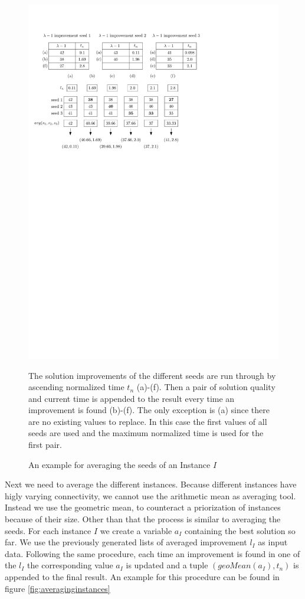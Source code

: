 \documentclass[a4paper,12pt,titlepage, BCOR7mm,headsepline]{scrbook}
\numberwithin{equation}{section}
\begin{document}
\begin{figure}[H] 
    
  \begin{center}
   \includegraphics[width=.9\textwidth]{Ipe/seed_averaging_example.pdf}
  \caption{An example for averaging the seeds of an Instance $I$}\label{fig:averagingseeds} %
  \end{center}
    The solution improvements of the different seeds are run through by ascending normalized time $t_n$ (a)-(f). Then a pair of solution quality and current time is appended to the result every time an improvement is found (b)-(f). The only exception is (a) since there are no existing values to replace. In this case the first values of all seeds are used and the maximum normalized time is used for the first pair.
\end{figure}

Next we need to average the different instances. Because different instances have higly varying connectivity, we cannot use the arithmetic mean as averaging tool. Instead we use the geometric mean, to counteract a priorization of instances because of their size. Other than that the process is similar to averaging the seeds. For each instance $I$ we create a variable $a_I$ containing the best solution so far. We use the previously generated lists of averaged improvement $l_I$ as input data. Following the same procedure, each time an improvement is found in one of the $l_I$ the corresponding value $a_I$ is updated and a tuple $(geoMean(a_I), t_n)$ is appended to the final result. An example for this procedure can be found in figure \ref{fig:averaginginstances}
\end{document}
